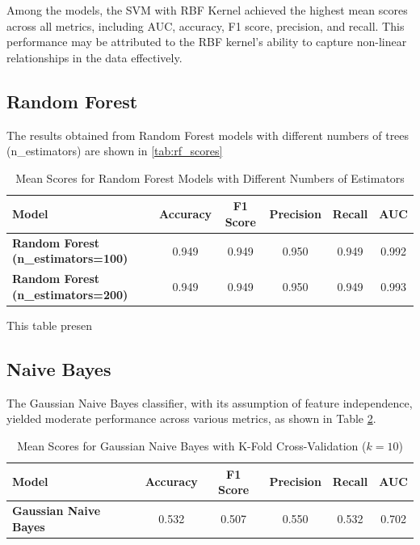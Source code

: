 Among the models, the SVM with RBF Kernel achieved the highest mean scores across all metrics, including AUC, accuracy, F1 score, precision, and recall. This performance may be attributed to the RBF kernel's ability to capture non-linear relationships in the data effectively. 



\subsection*{Random Forest}
The results obtained from Random Forest models with different numbers of trees (n\_estimators) are shown in \autoref{tab:rf_scores}

\begin{table}[htbp]
    \centering
    \begin{tabular}{|p{5cm}|c|c|c|c|c|}
    \hline
    \textbf{Model} & \textbf{Accuracy} & \textbf{F1 Score} & \textbf{Precision} & \textbf{Recall} & \textbf{AUC} \\ \hline
    \textbf{Random Forest (n\_estimators=100)} & 0.949 & 0.949 & 0.950 & 0.949 & 0.992 \\
    \textbf{Random Forest (n\_estimators=200)} & 0.949 & 0.949 & 0.950 & 0.949 & 0.993 \\ \hline
    \end{tabular}
    \caption{Mean Scores for Random Forest Models with Different Numbers of Estimators}
    \label{tab:rf_scores}
\end{table}

    
    This table presen



\subsection*{Naive Bayes}
The Gaussian Naive Bayes classifier, with its assumption of feature independence, yielded moderate performance across various metrics, as shown in Table \ref{tab:nb_scores}. 

\begin{table}[hhtbp]
    \centering
    \begin{tabular}{|l|c|c|c|c|c|}
    \hline
    \textbf{Model} & \textbf{Accuracy} & \textbf{F1 Score} & \textbf{Precision} & \textbf{Recall} & \textbf{AUC} \\
    \hline
    \textbf{Gaussian Naive Bayes} & 0.532 & 0.507 & 0.550 & 0.532 & 0.702 \\
    \hline
    \end{tabular}
    \caption{Mean Scores for Gaussian Naive Bayes with K-Fold Cross-Validation ($k=10$)}
    \label{tab:nb_scores}
    \end{table}



